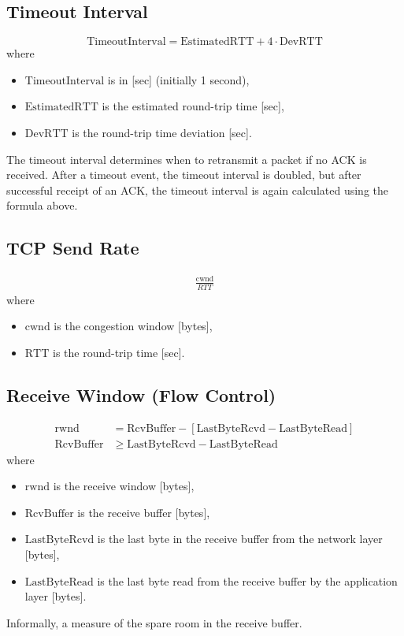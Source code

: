 \subsection{Timeout Interval}
\begin{equation*}
    \text{TimeoutInterval} = \text{EstimatedRTT} + 4 \cdot \text{DevRTT}
\end{equation*}
where
\begin{itemize}
    \item $\text{TimeoutInterval}$ is in [sec] (initially 1 second),
    \item $\text{EstimatedRTT}$ is the estimated round-trip time [sec],
    \item $\text{DevRTT}$ is the round-trip time deviation [sec].
\end{itemize}
The timeout interval determines when to retransmit a packet if no ACK is received. After a timeout event, the timeout interval is doubled, but after successful receipt of an ACK, the timeout interval is again calculated using the formula above.
\subsection{TCP Send Rate}
\begin{align*}
    \frac{\text{cwnd}}{RTT}
\end{align*}
where
\begin{itemize}
    \item $\text{cwnd}$ is the congestion window [bytes],
    \item $\text{RTT}$ is the round-trip time [sec].
\end{itemize}
\subsection{Receive Window (Flow Control)}
\begin{align*}
    \text{rwnd}      & = \text{RcvBuffer} - [\text{LastByteRcvd} - \text{LastByteRead}] \\
    \text{RcvBuffer} & \geq \text{LastByteRcvd} - \text{LastByteRead}
\end{align*}
where
\begin{itemize}
    \item $\text{rwnd}$ is the receive window [bytes],
    \item $\text{RcvBuffer}$ is the receive buffer [bytes],
    \item $\text{LastByteRcvd}$ is the last byte in the receive buffer from the network layer [bytes],
    \item $\text{LastByteRead}$ is the last byte read from the receive buffer by the application layer [bytes].
\end{itemize}
Informally, a measure of the spare room in the receive buffer.
